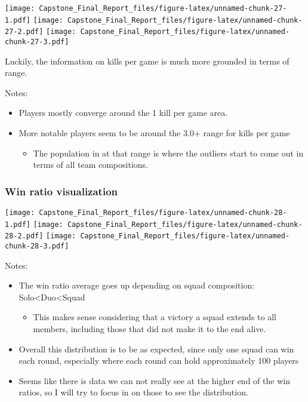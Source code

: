 \documentclass[]{article}
\providecommand{\tightlist}{%
  \setlength{\itemsep}{0pt}\setlength{\parskip}{0pt}}
\begin{document}
\texttt{[image: Capstone\_Final\_Report\_files/figure-latex/unnamed-chunk-27-1.pdf]}
\texttt{[image: Capstone\_Final\_Report\_files/figure-latex/unnamed-chunk-27-2.pdf]}
\texttt{[image: Capstone\_Final\_Report\_files/figure-latex/unnamed-chunk-27-3.pdf]}

Luckily, the information on kills per game is much more grounded in
terms of range.

Notes:

\begin{itemize}
\tightlist
\item
  Players mostly converge around the 1 kill per game area.
\item
  More notable players seem to be around the 3.0+ range for kills per
  game

  \begin{itemize}
  \tightlist
  \item
    The population in at that range is where the outliers start to come
    out in terms of all team compositions.
  \end{itemize}
\end{itemize}

\subsubsection{Win ratio visualization}\label{win-ratio-visualization}

\texttt{[image: Capstone\_Final\_Report\_files/figure-latex/unnamed-chunk-28-1.pdf]}
\texttt{[image: Capstone\_Final\_Report\_files/figure-latex/unnamed-chunk-28-2.pdf]}
\texttt{[image: Capstone\_Final\_Report\_files/figure-latex/unnamed-chunk-28-3.pdf]}

Notes:

\begin{itemize}
\tightlist
\item
  The win ratio average goes up depending on squad composition:
  Solo\textless{}Duo\textless{}Squad

  \begin{itemize}
  \tightlist
  \item
    This makes sense considering that a victory a squad extends to all
    members, including those that did not make it to the end alive.
  \end{itemize}
\item
  Overall this distribution is to be as expected, since only one squad
  can win each round, especially where each round can hold approximately
  100 players
\item
  Seems like there is data we can not really see at the higher end of
  the win ratios, so I will try to focus in on those to see the
  distribution.
\end{itemize}
\end{document}
